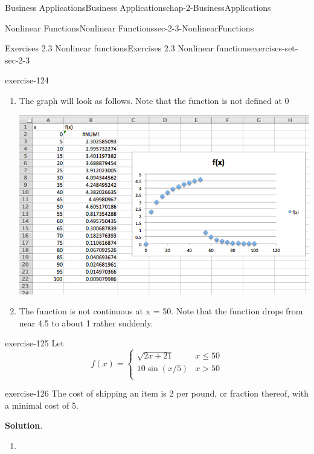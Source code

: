 \documentclass[oneside,10pt,]{book}
\numberwithin{equation}{section}
\newcommand{\gt}{>}
\begin{document}
\begin{chapterptx}{Business Applications}{}{Business Applications}{}{}{chap-2-BusinessApplications}
\begin{sectionptx}{Nonlinear Functions}{}{Nonlinear Functions}{}{}{sec-2-3-NonlinearFunctions}
\begin{exercises-subsection-numberless}{Exercises 2.3 Nonlinear functions}{}{Exercises 2.3 Nonlinear functions}{}{}{exercises-set-sec-2-3}
\begin{exercisegroup}
\begin{divisionexerciseeg}{9}{}{}{exercise-124}
\begin{enumerate}[label=(\alph*)]
\item\hypertarget{li-242}{}\hypertarget{p-847}{}%
The graph will look as follows. Note that the function is not defined at 0%
\begin{sidebyside}{1}{0.1}{0.1}{0}%
\begin{sbspanel}{0.8}%
\includegraphics[width=1\linewidth]{images/sec2-3-sol9b.png}
\end{sbspanel}%
\end{sidebyside}%
\item\hypertarget{li-243}{}\hypertarget{p-848}{}%
The function is not continuous at x = 50. Note that the function drops from near 4.5 to about 1 rather suddenly.%
\end{enumerate}
\end{divisionexerciseeg}%
\begin{divisionexerciseeg}{10}{}{}{exercise-125}%
\hypertarget{p-849}{}%
Let%
%
\begin{equation*}
f(x)=\begin{cases}
\sqrt{2x+21}&x \le 50\\
10\sin(x/5)&x \gt 50\\
\end{cases}
\end{equation*}
\end{divisionexerciseeg}%
\begin{divisionexerciseeg}{11}{}{}{exercise-126}%
\hypertarget{p-850}{}%
The cost of shipping an item is \textdollar{}2 per pound, or fraction thereof, with a minimal cost of \textdollar{}5.%
\par\smallskip%
\noindent\textbf{Solution}.\hypertarget{solution-61}{}\quad%
\leavevmode%
\begin{enumerate}[label=(\alph*)]
\item\hypertarget{li-244}{}\hypertarget{p-851}{}%

\end{enumerate}
\end{divisionexerciseeg}
\end{exercisegroup}
\end{exercises-subsection-numberless}
\end{sectionptx}
\end{chapterptx}
\end{document}
